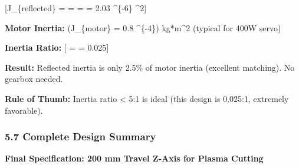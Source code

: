 \documentclass[
]{article}
\begin{document}
{[}J\_\{reflected\} =  = 
=  = 2.03 \^{}\{-6\}
\^{}2{]}

\textbf{Motor Inertia:} (J\_\{motor\} = 0.8 \^{}\{-4\})
kg*m\^{}2 (typical for 400W servo)

\textbf{Inertia Ratio:} {[} =
 = 0.025{]}

\textbf{Result:} Reflected inertia is only 2.5\% of motor inertia
(excellent matching). No gearbox needed.

\textbf{Rule of Thumb:} Inertia ratio \textless{} 5:1 is ideal (this
design is 0.025:1, extremely favorable).

\subsubsection{5.7 Complete Design
Summary}\label{complete-design-summary}

\textbf{Final Specification: 200 mm Travel Z-Axis for Plasma Cutting}
\end{document}
